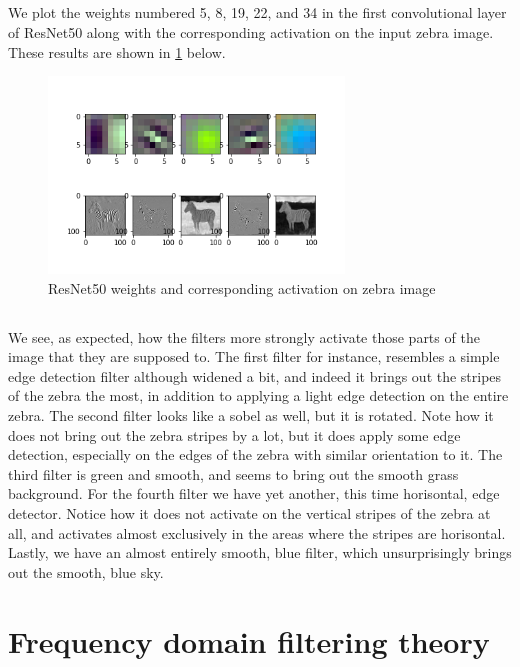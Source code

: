 \documentclass[]{article}
\begin{document}
\subsection{}
We plot the weights numbered 5, 8, 19, 22, and 34 in the first convolutional layer of ResNet50 along with the corresponding activation on the input zebra image. These results are shown in \ref{fig:zebra_activation} below.
\begin{figure}[H]
\centering
\includegraphics[width=0.7\textwidth]{zebra_activation}
\caption{ResNet50 weights and corresponding activation on zebra image}
\label{fig:zebra_activation}
\end{figure}

\subsection{}
We see, as expected, how the filters more strongly activate those parts of the image that they are supposed to. The first filter for instance, resembles a simple edge detection filter although widened a bit, and indeed it brings out the stripes of the zebra the most, in addition to applying a light edge detection on the entire zebra. The second filter looks like a sobel as well, but it is rotated. Note how it does not bring out the zebra stripes by a lot, but it does apply some edge detection, especially on the edges of the zebra with similar orientation to it. The third filter is green and smooth, and seems to bring out the smooth grass background. For the fourth filter we have yet another, this time horisontal, edge detector. Notice how it does not activate on the vertical stripes of the zebra at all, and activates almost exclusively in the areas where the stripes are horisontal. Lastly, we have an almost entirely smooth, blue filter, which unsurprisingly brings out the smooth, blue sky.

\section{Frequency domain filtering theory}
\end{document}
